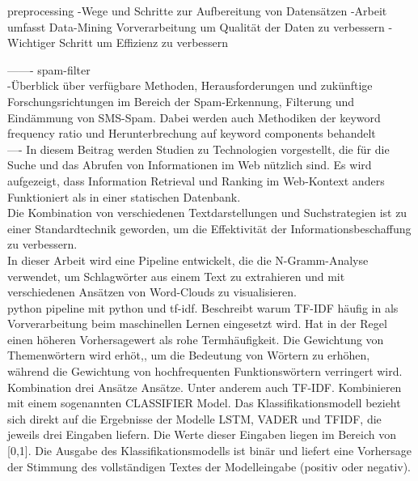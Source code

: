 preprocessing
\cite{alasadi2017review}
-Wege und Schritte zur Aufbereitung von Datensätzen
-Arbeit umfasst Data-Mining Vorverarbeitung um Qualität der Daten zu verbessern
-Wichtiger Schritt um Effizienz zu verbessern

-------
spam-filter\\
-Überblick über verfügbare Methoden, Herausforderungen und zukünftige Forschungsrichtungen im Bereich der Spam-Erkennung, Filterung und Eindämmung von SMS-Spam. Dabei werden auch Methodiken der keyword frequency ratio und Herunterbrechung auf keyword components behandelt \cite{shafi2017review}\\

----
In diesem Beitrag werden Studien zu Technologien vorgestellt, die für die Suche und das Abrufen von Informationen im Web nützlich sind. Es wird aufgezeigt, dass Information Retrieval und Ranking im Web-Kontext anders Funktioniert als in einer statischen Datenbank. \cite{kobayashi2000information}\\

Die Kombination von verschiedenen Textdarstellungen und Suchstrategien ist zu einer Standardtechnik geworden, um die Effektivität der Informationsbeschaffung zu verbessern.\cite{croft2000combining}\\

In dieser Arbeit wird eine Pipeline entwickelt, die die N-Gramm-Analyse verwendet, um Schlagwörter aus einem Text zu extrahieren und mit verschiedenen Ansätzen von Word-Clouds zu visualisieren.\cite{pirk2019implementierung}\\

python pipeline mit python und tf-idf. Beschreibt warum TF-IDF häufig in  als Vorverarbeitung beim maschinellen Lernen eingesetzt wird. Hat in der Regel einen höheren Vorhersagewert als rohe Termhäufigkeit. Die Gewichtung von Themenwörtern wird erhöt,, um die Bedeutung von Wörtern zu erhöhen, während die Gewichtung von hochfrequenten Funktionswörtern verringert wird.\cite{lavin2019analyzing}\\

Kombination drei Ansätze Ansätze. Unter anderem auch TF-IDF. Kombinieren mit einem sogenannten CLASSIFIER Model. Das Klassifikationsmodell bezieht sich direkt auf die
Ergebnisse der Modelle LSTM, VADER und TFIDF, die jeweils drei Eingaben liefern. Die Werte dieser Eingaben liegen im
Bereich von [0,1].
Die Ausgabe des Klassifikationsmodells ist binär und liefert eine Vorhersage der
Stimmung des vollständigen Textes der Modelleingabe (positiv oder negativ).\cite{chiny2021lstm}\\

